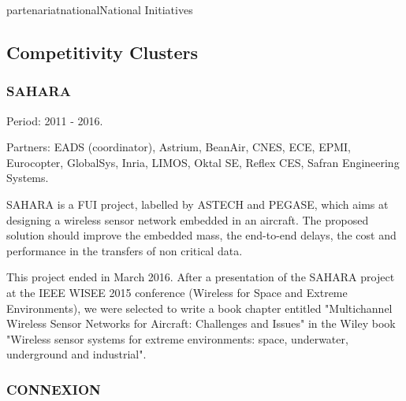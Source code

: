 \documentclass{ra2016}
\begin{document}
\begin{module}{partenariat}{national}{National Initiatives}


\subsection{Competitivity Clusters}

\subsubsection{SAHARA}

\begin{participants}
\end{participants}

Period: 2011 - 2016.

Partners: EADS (coordinator), Astrium, BeanAir, CNES, ECE, EPMI, Eurocopter, GlobalSys, Inria, LIMOS, Oktal SE, Reflex CES, Safran Engineering Systems.

SAHARA is a FUI project, labelled by ASTECH and PEGASE, which aims at designing a wireless sensor network embedded in an aircraft. The proposed solution should improve the embedded mass, the end-to-end delays, the cost and performance in the transfers of non critical data. 

This project ended in March 2016. After a presentation of the SAHARA project at the IEEE WISEE 2015 conference (Wireless for Space and Extreme Environments), we were selected to write a book chapter entitled "Multichannel Wireless Sensor Networks for Aircraft: Challenges and Issues" in the Wiley book
"Wireless sensor systems for extreme environments: space, underwater, underground and industrial". 

\subsubsection{CONNEXION}


\end{module}
\end{document}
